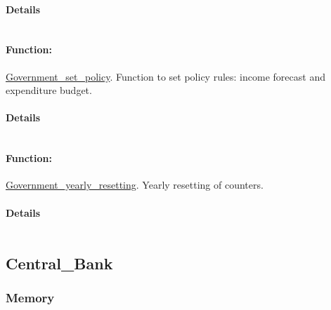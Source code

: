 \documentclass[a4paper,11pt]{article}
\begin{document}
\paragraph{Details}
\begin{verbatim}
\end{verbatim}
\paragraph{Function:}\url{Government_set_policy}.
Function to set policy rules: income forecast and expenditure budget.
\paragraph{Details}
\begin{verbatim}
\end{verbatim}
\paragraph{Function:}\url{Government_yearly_resetting}.
Yearly resetting of counters.
\paragraph{Details}
\begin{verbatim}
\end{verbatim}
\subsection{Central\_Bank}

\subsubsection{Memory}
\end{document}
